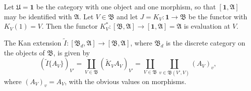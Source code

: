 Let $\mathfrak{U} = \mathbf{1}$ be the category with one object and one morphism, so that $[\mathbf{1}, \mathfrak{A}]$ may be identified with $\mathfrak{A}$. Let $V \in \mathfrak{B}$ and let $J = K_V : \mathbf{1} \rightarrow \mathfrak{B}$ be the functor with $K_V(1) = V$. Then the functor $K_V^* : [\mathfrak{B}, \mathfrak{A}] \rightarrow [\mathbf{1}, \mathfrak{A}] = \mathfrak{A}$ is evaluation at $V$.

The Kan extension $\tilde{I}: [\mathfrak{B}_d, \mathfrak{A}] \rightarrow [\mathfrak{B}, \mathfrak{A}]$, where $\mathfrak{B}_d$ is the discrete category on the objects of $\mathfrak{B}$, is given by
$$(\tilde{I}\{A_V\})_{V'} = \coprod_{V \in \mathfrak{B}} (\tilde{K}_V A_V)_{V'} = \coprod_{V \in \mathfrak{B}} \coprod_{v \in \mathfrak{B}(V', V)} (A_V)_v,$$
where $(A_V)_v = A_V$, with the obvious values on morphisms.

